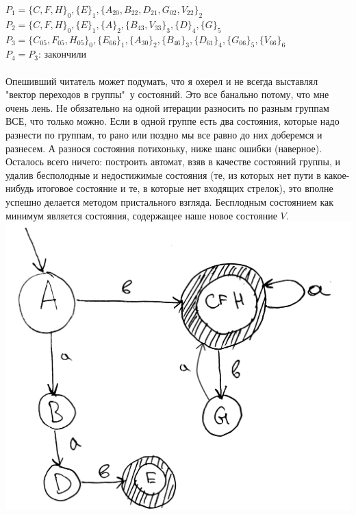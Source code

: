 \documentclass[14pt]{extreport}
\begin{document}
	$P_1=\{C, F, H\}_0,\{E\}_1,\{A_{20}, B_{22}, D_{21}, G_{02}, V_{22}\}_2$\\
	$P_2=\{C, F, H\}_0,\{E\}_1,\{A\}_2,\{B_{43}, V_{33}\}_3, \{D\}_4, \{G\}_5$\\
	$P_3=\{C_{05}, F_{05}, H_{05}\}_0,\{E_{66}\}_1,\{A_{30}\}_2,\{B_{46}\}_3, \{D_{61}
	\}_4, \{G_{06}\}_5, \{V_{66}\}_6$\\
	$P_4=P_3$: закончили\\\\
	\newpage
	Опешивший читатель может подумать, что я охерел и не всегда выставлял
	"вектор переходов в группы"\ у состояний. Это все банально потому, что мне очень лень.
	Не обязательно на одной итерации разносить по разным группам ВСЕ, что только можно.
	Если в одной группе есть два состояния, которые надо разнести по группам, то рано или поздно
	мы все равно до них доберемся и разнесем. А разнося состояния потихоньку, ниже шанс ошибки
	(наверное).\\
	Осталось всего ничего: построить автомат, взяв в качестве состояний группы, и удалив
	бесполодные и недостижимые состояния (те, из которых нет пути в какое-нибудь итоговое
	состояние и те, в которые нет входящих стрелок), это вполне успешно делается методом
	пристального взгляда. 
	Бесплодным состоянием как минимум является состояния, содержащее наше новое состояние $V$.\\
	\includegraphics[scale=0.13]{data/pic4_2.png}
	\newpage
\end{document}
